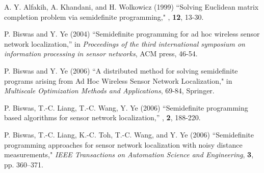 \documentclass[12pt]{article}
\begin{document}
%
 \begin{thebibliography}{99}

 A. Y. Alfakih, A. Khandani, and H. Wolkowicz (1999)
\newblock ``Solving Euclidean matrix completion problem via semidefinite programming,"
, {\bf 12}, 13-30.

P. Biswas and Y. Ye (2004)
\newblock ``Semidefinite programming  for ad hoc wireless sensor network localization,''
\newblock in {\em  Proceedings of the third international symposium on information processing
in sensor networks}, ACM press, 46-54.

P. Biswas and Y. Ye  (2006)
\newblock ``A distributed method for solving semidefinite programs arising from Ad Hoc Wireless Sensor Network Localization,"
\newblock in {\em Multiscale Optimization Methods and Applications}, 69-84, Springer.

P. Biswas, T.-C. Liang, T.-C. Wang, Y. Ye (2006)
\newblock ``Semidefinite programming based algorithms for sensor network localization,''
, {\bf 2}, 188-220.

 P. Biswas, T.-C. Liang, K.-C. Toh, T.-C. Wang, and Y. Ye (2006)
\newblock ``Semidefinite programming approaches for sensor network localization with noisy 
distance measurements," {\em IEEE Transactions on Automation Science and Engineering},  {\bf 3}, pp. 360--371.

%







\end{thebibliography}
\end{document}
